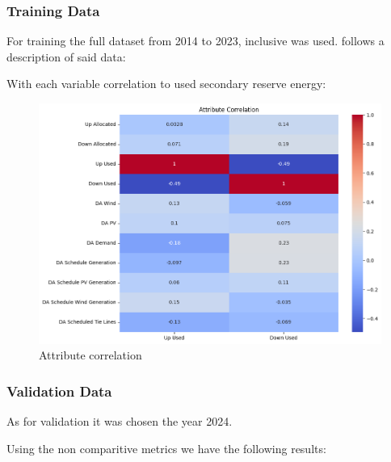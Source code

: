 \subsubsection{Training Data}
For training the full dataset from 2014 to 2023, inclusive was used. follows a description of said data:



With each variable correlation to used secondary reserve energy:

\begin{figure}[H]
    \centering
    \includegraphics[width=\textwidth]{plots/correlation_heatmap.png}
    \caption{Attribute correlation}
    \label{fig:Attribute_correlation}
  \end{figure}
  
  
  

\subsubsection{Validation Data}
As for validation it was chosen the year 2024.\par
Using the non comparitive metrics we have the following results:


